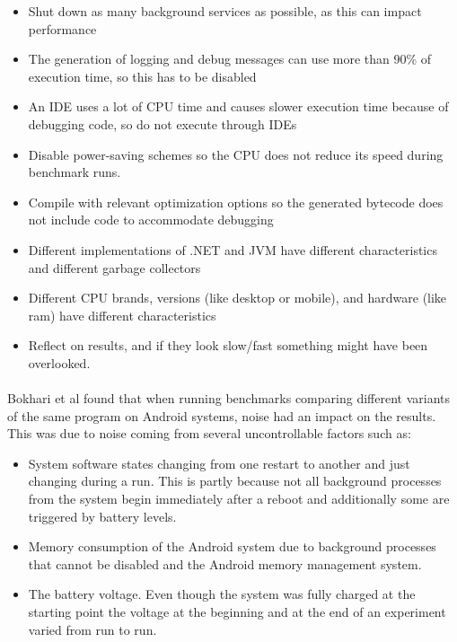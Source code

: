 \begin{itemize}    
    \item Shut down as many background services as possible, as this can impact performance
    \item The generation of logging and debug messages can use more than 90\% of execution time, so this has to be disabled
    \item An IDE uses a lot of CPU time and causes slower execution time because of debugging code, so do not execute through IDEs
    \item Disable power-saving schemes so the CPU does not reduce its speed during benchmark runs.
    \item Compile with relevant optimization options so the generated bytecode does not include code to accommodate debugging
    \item Different implementations of .NET and JVM have different characteristics and different garbage collectors
    \item Different CPU brands, versions (like desktop or mobile), and hardware (like ram) have different characteristics
    \item Reflect on results, and if they look slow/fast something might have been overlooked.
\end{itemize}


\paragraph*{}
Bokhari et al\cite{Bokhari2020r3} found that when running benchmarks comparing different variants of the same program on Android systems, noise had an impact on the results. This was due to noise coming from several uncontrollable factors such as:\cite{Bokhari2020r3}

\begin{itemize}
    \item System software states changing from one restart to another and just changing during a run. This is partly because not all background processes from the system begin immediately after a reboot and additionally some are triggered by battery levels.
    \item Memory consumption of the Android system due to background processes that cannot be disabled and the Android memory management system.
    \item The battery voltage. Even though the system was fully charged at the starting point the voltage at the beginning and at the end of an experiment varied from run to run.
\end{itemize}

